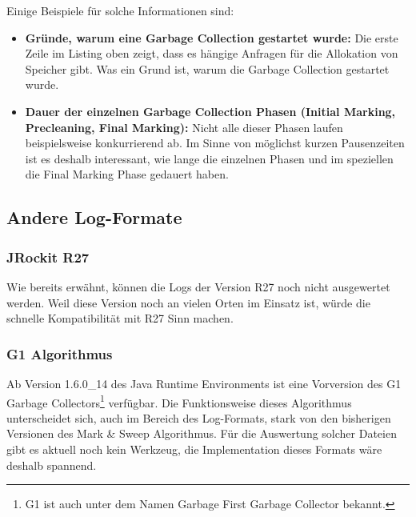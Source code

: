 Einige Beispiele für solche Informationen sind:
\begin{itemize}
	\item \textbf{Gründe, warum eine Garbage Collection gestartet wurde:  }Die erste Zeile im Listing oben zeigt, dass es hängige Anfragen für die Allokation von Speicher gibt. Was ein Grund ist, warum die Garbage Collection gestartet wurde.
	\item \textbf{Dauer der einzelnen Garbage Collection Phasen (Initial Marking, Precleaning, Final Marking): } Nicht alle dieser Phasen laufen beispielsweise konkurrierend ab. Im Sinne von möglichst kurzen Pausenzeiten ist es deshalb interessant, wie lange die einzelnen Phasen und im speziellen die Final Marking Phase gedauert haben. 
\end{itemize}

\subsection{Andere Log-Formate}
\subsubsection{JRockit R27}\label{analyseumfang_jr27}
Wie bereits erwähnt, können die Logs der Version R27 noch nicht ausgewertet werden. Weil diese Version noch an vielen Orten im Einsatz ist, würde die schnelle Kompatibilität mit R27 Sinn machen.

\subsubsection{G1 Algorithmus}
Ab Version 1.6.0\_14 des Java Runtime Environments ist eine Vorversion des G1 Garbage Collectors\footnote{G1 ist auch unter dem Namen Garbage First Garbage Collector bekannt.} verfügbar. Die Funktionsweise dieses Algorithmus unterscheidet sich, auch im Bereich des Log-Formats, stark von den bisherigen Versionen des Mark \& Sweep Algorithmus. Für die Auswertung solcher Dateien gibt es aktuell noch kein Werkzeug, die Implementation dieses Formats wäre deshalb spannend.







